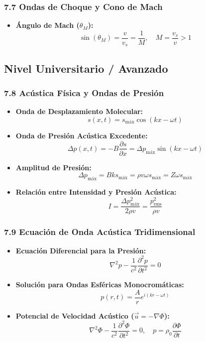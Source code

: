 \documentclass[11pt,a4paper]{article}
\begin{document}
\subsubsection*{7.7 Ondas de Choque y Cono de Mach}

\begin{itemize}
  \item \textbf{Ángulo de Mach ($\theta_M$):}
  \[
    \sin(\theta_M) = \frac{v}{v_s} = \frac{1}{M}, \quad M = \frac{v_s}{v} > 1
  \]
\end{itemize}

\subsection*{Nivel Universitario / Avanzado}

\subsubsection*{7.8 Acústica Física y Ondas de Presión}

\begin{itemize}
  \item \textbf{Onda de Desplazamiento Molecular:}
  \[
    s(x, t) = s_{\text{máx}} \cos(kx - \omega t)
  \]
  \item \textbf{Onda de Presión Acústica Excedente:}
  \[
    \Delta p(x, t) = -B \frac{\partial s}{\partial x} = \Delta p_{\text{máx}} \sin(kx - \omega t)
  \]
  \item \textbf{Amplitud de Presión:}
  \[
    \Delta p_{\text{máx}} = B k s_{\text{máx}} = \rho v \omega s_{\text{máx}} = Z \omega s_{\text{máx}}
  \]
  \item \textbf{Relación entre Intensidad y Presión Acústica:}
  \[
    I = \frac{\Delta p_{\text{máx}}^2}{2\rho v} = \frac{p_{\text{rms}}^2}{\rho v}
  \]
\end{itemize}

\subsubsection*{7.9 Ecuación de Onda Acústica Tridimensional}

\begin{itemize}
  \item \textbf{Ecuación Diferencial para la Presión:}
  \[
    \nabla^2 p - \frac{1}{c^2} \frac{\partial^2 p}{\partial t^2} = 0
  \]
  \item \textbf{Solución para Ondas Esféricas Monocromáticas:}
  \[
    p(r, t) = \frac{A}{r} e^{i(kr - \omega t)}
  \]
  \item \textbf{Potencial de Velocidad Acústico ($\vec{u} = -\nabla \Phi$):}
  \[
    \nabla^2 \Phi - \frac{1}{c^2} \frac{\partial^2 \Phi}{\partial t^2} = 0, \quad p = \rho_0 \frac{\partial \Phi}{\partial t}
  \]
\end{itemize}
\end{document}
